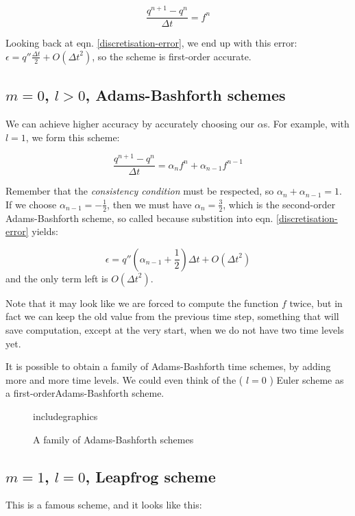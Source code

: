 \begin{equation}
	\frac{q^{n+1}-q^n}{\Delta t} = f^n
	\label{Euler}
\end{equation}

Looking back at eqn. \ref{discretisation-error}, we end up with this error: $\epsilon = q''\frac{\Delta t}{2} + O({\Delta t}^2)$, so the scheme is first-order accurate. 

\subsection{$m=0$, $l>0$, Adams-Bashforth schemes}
We can achieve higher accuracy by accurately choosing our $\alpha$s. For example, with $l=1$, we form this scheme: 

\begin{equation}
	\frac{q^{n+1}-q^n}{\Delta t} = \alpha_n f^n + \alpha_{n-1} f^{n-1}
	\label{2nd-order-BA}
\end{equation}

Remember that the \emph{consistency condition} must be respected, so $\alpha_n + \alpha_{n-1}=1$. If we choose $\alpha_{n-1} = -\frac{1}{2}$, then we must have $\alpha_{n} = \frac{3}{2}$, which is the second-order Adams-Bashforth scheme, so called because substition into eqn. \ref{discretisation-error} yields: 

\begin{equation}
	\epsilon = q'' \left( \alpha_{n-1} + \frac{1}{2} \right) \Delta t + O({\Delta t}^2)
\end{equation}
and the only term left is $O({\Delta t}^2)$.

Note that it may look like we are forced to compute the function $f$ twice, but in fact we can keep the old value from the previous time step, something that will save computation, except at the very start, when we do not have two time levels yet.

It is possible to obtain a family of Adams-Bashforth time schemes, by adding more and more time levels. We could even think of the ( $l=0$ ) Euler scheme as a first-orderAdams-Bashforth scheme.

\begin{figure}
	includegraphics{}
	\caption{A family of Adams-Bashforth schemes}
	\label{Fig:Adams-Bashforth}
\end{figure}

\subsection{$m=1$, $l=0$, Leapfrog scheme}
This is a famous scheme, and it looks like this: 


